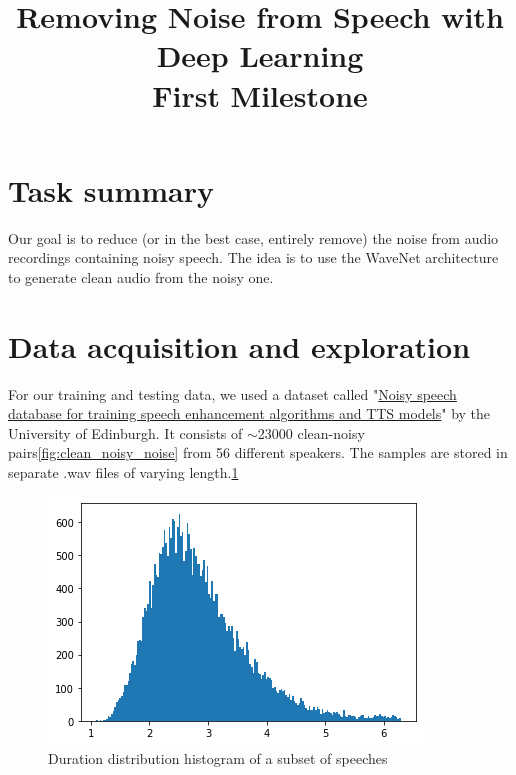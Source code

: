 \documentclass[12pt]{article}
\title{Removing Noise from Speech with Deep Learning\\
	\Large{First Milestone}}
\author{}
\date{}
\begin{document}

	\maketitle
	\section{Task summary}
	Our goal is to reduce (or in the best case, entirely remove) the noise from audio recordings containing noisy speech. The idea is to use the WaveNet\cite{wavenet}\cite{rethage2018wavenet} architecture to generate clean audio from the noisy one.
	
	
	\section{Data acquisition and exploration}
	For our training and testing data, we used a dataset called "\href{https://datashare.is.ed.ac.uk/handle/10283/2791}{Noisy speech database for training speech enhancement algorithms and TTS models}"\cite{dataset} by the University of Edinburgh. It consists of $\sim$23000 clean-noisy pairs\ref{fig:clean_noisy_noise} from 56 different speakers. 
	The samples are stored in separate .wav files of varying length.\ref{fig:durations}  

	\begin{figure}[H]
		\centering
		\includegraphics[width=.5\linewidth]{durations}
		\caption{Duration distribution histogram of a subset of speeches}
		\label{fig:durations}
	\end{figure}
\end{document}
